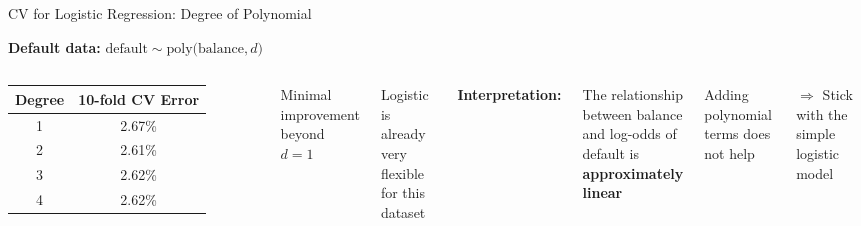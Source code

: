 \documentclass[aspectratio=169, 11pt]{beamer}
\begin{document}
\begin{frame}{CV for Logistic Regression: Degree of Polynomial}

\textbf{Default data:} $\text{default} \sim \text{poly(balance}, d)$

\vspace{0.3em}
\begin{columns}
\begin{tabular}{cc}
\toprule
Degree & 10-fold CV Error \\
\midrule
1 & 2.67\% \\
\textcolor{softgreen}{2} & \textcolor{softgreen}{2.61\%} \\
3 & 2.62\% \\
4 & 2.62\% \\
\bottomrule
\end{tabular}

\vspace{0.3em}
Minimal improvement beyond $d=1$

Logistic is already very flexible\\
for this dataset

\textbf{Interpretation:}

The relationship between balance\\
and log-odds of default is\\
\textbf{approximately linear}

\vspace{0.3em}
Adding polynomial terms does not help

\vspace{0.3em}
$\Rightarrow$ Stick with the simple logistic model
\end{columns}
\end{frame}
\end{document}
